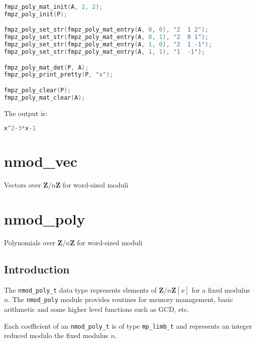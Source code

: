 \documentclass[a4paper,10pt]{book}
\newcommand{\Z}{\mathbf{Z}}%
\newcommand{\code}{\lstinline}
\begin{document}
{{\begin{lstlisting}[language=c]
fmpz_poly_mat_init(A, 2, 2);
fmpz_poly_init(P);

fmpz_poly_set_str(fmpz_poly_mat_entry(A, 0, 0), "2  1 2");
fmpz_poly_set_str(fmpz_poly_mat_entry(A, 0, 1), "2  0 1");
fmpz_poly_set_str(fmpz_poly_mat_entry(A, 1, 0), "2  1 -1");
fmpz_poly_set_str(fmpz_poly_mat_entry(A, 1, 1), "1  -1");

fmpz_poly_mat_det(P, A);
fmpz_poly_print_pretty(P, "x");

fmpz_poly_clear(P);
fmpz_poly_mat_clear(A);
\end{lstlisting}

The output is:
\begin{lstlisting}[language=c]
x^2-3*x-1
\end{lstlisting}




\chapter{nmod\_vec}
\epigraph{Vectors over $\Z / n \Z$ for word-sized moduli}{}




\chapter{nmod\_poly}
\epigraph{Polynomials over $\Z / n \Z$ for word-sized moduli}{}

\section{Introduction}

The \code{nmod_poly_t} data type represents elements of $\Z/n\Z[x]$ for
a fixed modulus $n$. The \code{nmod_poly} module provides routines for
memory management, basic arithmetic and some higher level functions
such as GCD, etc.

Each coefficient of an \code{nmod_poly_t} is of type \code{mp_limb_t}
and represents an integer reduced modulo the fixed modulus $n$.

}}
\end{document}
